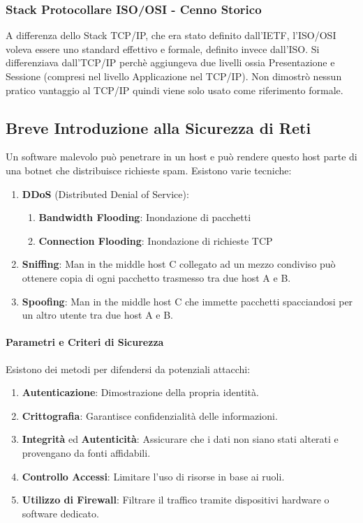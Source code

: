 \documentclass{article}
\begin{document}
\subsubsection{Stack Protocollare ISO/OSI - Cenno Storico}

A differenza dello Stack TCP/IP, che era stato definito dall'IETF, l'ISO/OSI voleva essere uno standard effettivo e formale, definito invece dall'ISO.
Si differenziava dall'TCP/IP perchè aggiungeva due livelli ossia Presentazione e Sessione (compresi nel livello Applicazione nel TCP/IP).
Non dimostrò nessun pratico vantaggio al TCP/IP quindi viene solo usato come riferimento formale.

\subsection{Breve Introduzione alla Sicurezza di Reti}

Un software malevolo può penetrare in un host e può rendere questo host parte di una botnet che distribuisce richieste spam. Esistono varie tecniche:

\begin{enumerate}
    \item \textbf{DDoS} (Distributed Denial of Service):
    \begin{enumerate}
        \item \textbf{Bandwidth Flooding}: Inondazione di pacchetti
        \item \textbf{Connection Flooding}: Inondazione di richieste TCP
    \end{enumerate}
    \item \textbf{Sniffing}: Man in the middle host C collegato ad un mezzo condiviso può ottenere copia di ogni pacchetto trasmesso tra due host A e B.
    \item \textbf{Spoofing}: Man in the middle host C che immette pacchetti spacciandosi per un altro utente tra due host A e B.
\end{enumerate}

\newpage

\paragraph{Parametri e Criteri di Sicurezza} Esistono dei metodi per difendersi da potenziali attacchi:

\begin{enumerate}
    \item \textbf{Autenticazione}: Dimostrazione della propria identità.
    \item \textbf{Crittografia}: Garantisce confidenzialità delle informazioni.
    \item \textbf{Integrità} ed \textbf{Autenticità}: Assicurare che i dati non siano stati alterati e provengano da fonti affidabili.
    \item \textbf{Controllo Accessi}: Limitare l'uso di risorse in base ai ruoli.
    \item \textbf{Utilizzo di Firewall}: Filtrare il traffico tramite dispositivi hardware o software dedicato.
\end{enumerate}
\end{document}
